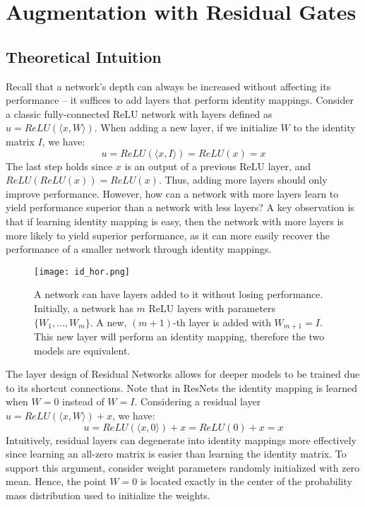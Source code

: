 \documentclass{article} \RequirePackage{amsmath,amsthm,amsfonts,amssymb}
\begin{document}
\section{Augmentation with Residual Gates}

\subsection{Theoretical Intuition}

Recall that a network's depth can always be increased without affecting its performance -- it suffices to add layers that perform identity mappings. Consider a classic fully-connected ReLU network with layers defined as $u = ReLU( \langle x,W \rangle )$. When adding a new layer, if we initialize $W$ to the identity matrix $I$, we have:
\begin{equation*}
	u = ReLU(\langle x, I \rangle) = ReLU(x) = x
\end{equation*}
The last step holds since $x$ is an output of a previous ReLU layer, and $ReLU(ReLU(x)) = ReLU(x)$. Thus, adding more layers should only improve performance. However, how can a network with more layers learn to yield performance superior than a network with less layers? A key observation is that if learning identity mapping is easy, then the network with more layers is more likely to yield superior performance, as it can more easily recover the performance of a smaller network through identity mappings. 



\begin{figure}[!ht]
  \centering
    \texttt{[image: id\_hor.png]}
  \caption{A network can have layers added to it without losing performance. Initially, a network has $m$ ReLU layers with parameters $\{W_1, \dots, W_m \}$. A new, $(m+1)$-th layer is added with $W_{m+1} = I$. This new layer will perform an identity mapping, therefore the two models are equivalent.}
\label{id}
\end{figure}


The layer design of Residual Networks allows for deeper models to be trained due to its shortcut connections. Note that in ResNets the identity mapping is learned when $W = 0$ instead of $W = I$. Considering a residual layer $u = ReLU( \langle x,W \rangle ) + x$, we have:
\begin{equation*}
	u = ReLU(\langle x, 0 \rangle) + x = ReLU(0) + x = x
\end{equation*}
Intuitively, residual layers can degenerate into identity mappings more effectively since learning an all-zero matrix is easier than learning the identity matrix. To support this argument, consider weight parameters randomly initialized with zero mean. Hence, the point $W = 0$ is located exactly in the center of the probability mass distribution used to initialize the weights.
\end{document}
